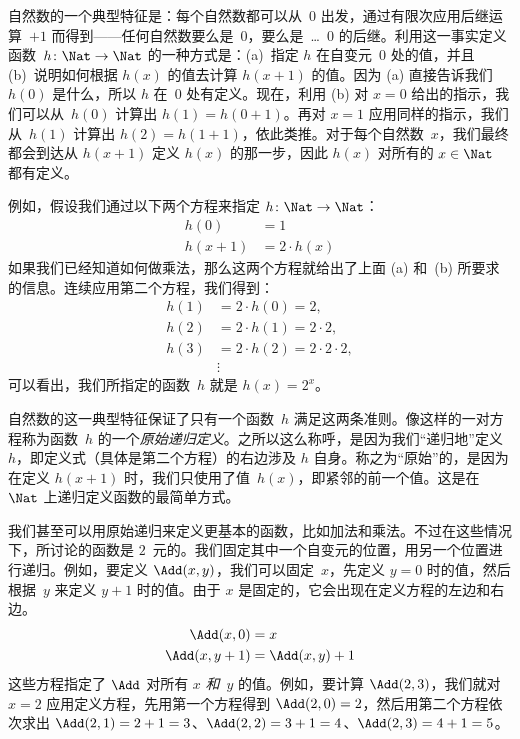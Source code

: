 \documentclass[../../../include/open-logic-section]{subfiles}
\begin{document}

自然数的一个典型特征是：每个自然数都可以从~$0$ 出发，通过有限次应用后继运算~$+1$ 而得到——任何自然数要么是~$0$，要么是~\dots{}~$0$ 的后继。利用这一事实定义函数~$h\colon\Nat \to \Nat$ 的一种方式是：(a)~指定 $h$ 在自变元~$0$ 处的值，并且 (b)~说明如何根据 $h(x)$ 的值去计算 $h(x+1)$ 的值。因为 (a) 直接告诉我们 $h(0)$ 是什么，所以 $h$ 在~$0$ 处有定义。现在，利用 (b) 对 $x=0$ 给出的指示，我们可以从~$h(0)$ 计算出 $h(1) = h(0+1)$。再对 $x=1$ 应用同样的指示，我们从~$h(1)$ 计算出 $h(2) = h(1+1)$，依此类推。对于每个自然数~$x$，我们最终都会到达从 $h(x+1)$ 定义 $h(x)$ 的那一步，因此 $h(x)$ 对所有的 $x \in \Nat$ 都有定义。

例如，假设我们通过以下两个方程来指定 $h\colon \Nat \to \Nat$：
\begin{align*}
h(0) & =  1\\
h(x+1) & =  2 \cdot h(x)
\end{align*}
如果我们已经知道如何做乘法，那么这两个方程就给出了上面 (a) 和~(b) 所要求的信息。连续应用第二个方程，我们得到：
\begin{align*}
  h(1) & = 2\cdot h(0) = 2,\\
  h(2) & = 2\cdot h(1) = 2\cdot 2,\\
  h(3) & = 2 \cdot h(2) = 2\cdot 2 \cdot 2,\\
  & \vdots
\end{align*}
可以看出，我们所指定的函数~$h$ 就是 $h(x) = 2^x$。

自然数的这一典型特征保证了只有一个函数~$h$ 满足这两条准则。像这样的一对方程称为函数~$h$ 的一个\emph{原始递归定义}。之所以这么称呼，是因为我们“递归地”定义~$h$，即定义式（具体是第二个方程）的右边涉及 $h$ 自身。称之为“原始”的，是因为在定义 $h(x+1)$ 时，我们只使用了值~$h(x)$，即紧邻的前一个值。这是在~$\Nat$ 上递归定义函数的最简单方式。

我们甚至可以用原始递归来定义更基本的函数，比如加法和乘法。不过在这些情况下，所讨论的函数是 $2$~元的。我们固定其中一个自变元的位置，用另一个位置进行递归。例如，要定义 $\Add(x, y)$，我们可以固定~$x$，先定义 $y=0$ 时的值，然后根据~$y$ 来定义 $y+1$ 时的值。由于 $x$ 是固定的，它会出现在定义方程的左边和右边。
\begin{align*}
\Add(x,0) & =  x\\
\Add(x,y+1) & =  \Add(x,y)+1
\end{align*}
这些方程指定了 $\Add$ 对所有 $x$ \emph{和}~$y$ 的值。例如，要计算 $\Add(2,3)$，我们就对 $x = 2$ 应用定义方程，先用第一个方程得到 $\Add(2,0) = 2$，然后用第二个方程依次求出 $\Add(2,1) = 2 + 1 = 3$、$\Add(2, 2) = 3 + 1 = 4$、$\Add(2,
3) = 4 + 1 = 5$。
\end{document}

